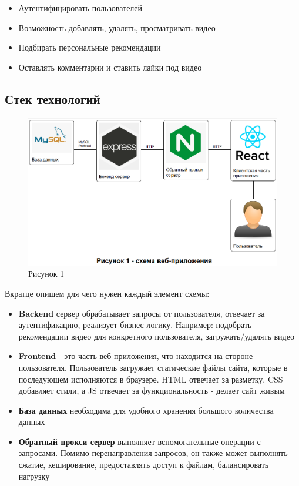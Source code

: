 \documentclass[12pt]{article}
\begin{document}
\begin{itemize}
    \item Аутентифицировать пользователей
    \item Возможность добавлять, удалять, просматривать видео
    \item Подбирать персональные рекомендации
    \item Оставлять комментарии и ставить лайки под видео
\end{itemize}

\subsection{Стек технологий}

\begin{figure}[H]
    \centering
    \includegraphics[width=1\textwidth]{../images/Схема_веб-приложения.png}
    \caption{Рисунок 1}
\end{figure}

Вкратце опишем для чего нужен каждый элемент схемы:

\begin{itemize}
    \item \textbf{Backend} сервер обрабатывает запросы от пользователя, отвечает за аутентификацию,
          реализует бизнес логику. Например: подобрать рекомендации видео для конкретного пользователя, загружать/удалять видео
    \item \textbf{Frontend} - это часть веб-приложения, что находится на стороне пользователя.
          Пользователь загружает статические файлы сайта, которые в последующем исполняются в браузере.
          HTML отвечает за разметку, CSS добавляет стили, а JS отвечает за функциональность - делает сайт живым
    \item \textbf{База данных} необходима для удобного хранения большого количества данных
    \item \textbf{Обратный прокси сервер} выполняет вспомогательные операции с запросами.
          Помимо перенаправления запросов, он также может выполнять сжатие, кеширование, предоставлять доступ к файлам,
          балансировать нагрузку
\end{itemize}
\end{document}
